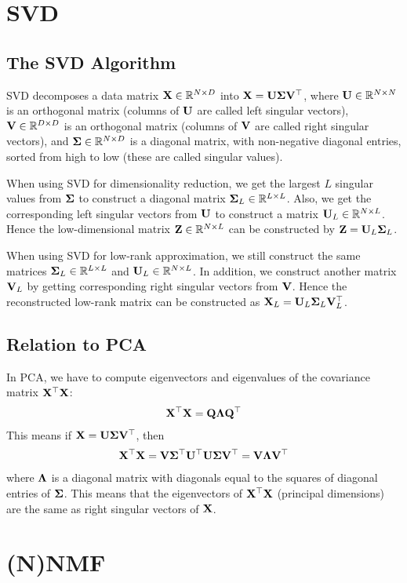 \section{SVD}

\subsection{The SVD Algorithm}

SVD decomposes a data matrix $\mathbf{X}\in\mathbb{R}^{N\times D}$ into $\mathbf{X}=\mathbf{U}\mathbf{\Sigma}\mathbf{V}{}^\top$, where $\mathbf{U}\in\mathbb{R}^{N\times N}$ is an orthogonal matrix (columns of $\mathbf{U}$ are called left singular vectors), $\mathbf{V}\in\mathbb{R}^{D\times D}$ is an orthogonal matrix (columns of $\mathbf{V}$ are called right singular vectors), and $\mathbf{\Sigma}\in\mathbb{R}^{N\times D}$ is a diagonal matrix, with non-negative diagonal entries, sorted from high to low (these are called singular values).

When using SVD for dimensionality reduction, we get the largest $L$ singular values from $\mathbf{\Sigma}$ to construct a diagonal matrix $\mathbf{\Sigma}_L\in\mathbb{R}^{L\times L}$. Also, we get the corresponding left singular vectors from $\mathbf{U}$ to construct a matrix $\mathbf{U}_L\in\mathbb{R}^{N\times L}$. Hence the low-dimensional matrix $\mathbf{Z}\in\mathbb{R}^{N\times L}$ can be constructed by $\mathbf{Z}=\mathbf{U}_L\mathbf{\Sigma}_L$.

When using SVD for low-rank approximation, we still construct the same matrices $\mathbf{\Sigma}_L\in\mathbb{R}^{L\times L}$ and $\mathbf{U}_L\in\mathbb{R}^{N\times L}$. In addition, we construct another matrix $\mathbf{V}_L$ by getting corresponding right singular vectors from $\mathbf{V}$. Hence the reconstructed low-rank matrix can be constructed as $\mathbf{X}_L=\mathbf{U}_L\mathbf{\Sigma}_L\mathbf{V}_L^\top$.

\subsection{Relation to PCA}

In PCA, we have to compute eigenvectors and eigenvalues of the covariance matrix $\mathbf{X}{}^\top\mathbf{X}$:
\begin{align*}
	\mathbf{X}{}^\top\mathbf{X}=\mathbf{Q}\mathbf{\Lambda}\mathbf{Q}{}^\top
\end{align*}
This means if $\mathbf{X}=\mathbf{U}\mathbf{\Sigma}\mathbf{V}{}^\top$, then
\begin{align*}
	\mathbf{X}{}^\top\mathbf{X}=\mathbf{V}\mathbf{\Sigma}{}^\top\mathbf{U}{}^\top\mathbf{U}\mathbf{\Sigma}\mathbf{V}{}^\top=\mathbf{V}\mathbf{\Lambda}\mathbf{V}{}^\top
\end{align*}
where $\mathbf{\Lambda}$ is a diagonal matrix with diagonals equal to the squares of diagonal entries of $\mathbf{\Sigma}$. This means that the eigenvectors of $\mathbf{X}{}^\top\mathbf{X}$ (principal dimensions) are the same as right singular vectors of $\mathbf{X}$.

\section{(N)NMF}
